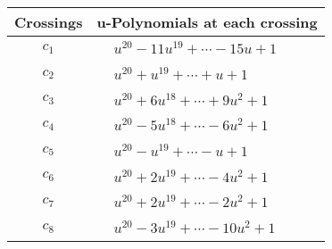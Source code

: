\documentclass[1p]{elsarticle_modified}
\theoremstyle{definition}
\begin{document}
\begin{tabular}{m{50pt}|m{274pt}}
Crossings & \hspace{64pt}u-Polynomials at each crossing \\
\hline $$\begin{aligned}c_{1}\end{aligned}$$&$\begin{aligned}
&u^{20}-11 u^{19}+\cdots-15 u+1
\end{aligned}$\\
\hline $$\begin{aligned}c_{2}\end{aligned}$$&$\begin{aligned}
&u^{20}+u^{19}+\cdots+u+1
\end{aligned}$\\
\hline $$\begin{aligned}c_{3}\end{aligned}$$&$\begin{aligned}
&u^{20}+6 u^{18}+\cdots+9 u^2+1
\end{aligned}$\\
\hline $$\begin{aligned}c_{4}\end{aligned}$$&$\begin{aligned}
&u^{20}-5 u^{18}+\cdots-6 u^2+1
\end{aligned}$\\
\hline $$\begin{aligned}c_{5}\end{aligned}$$&$\begin{aligned}
&u^{20}- u^{19}+\cdots- u+1
\end{aligned}$\\
\hline $$\begin{aligned}c_{6}\end{aligned}$$&$\begin{aligned}
&u^{20}+2 u^{19}+\cdots-4 u^2+1
\end{aligned}$\\
\hline $$\begin{aligned}c_{7}\end{aligned}$$&$\begin{aligned}
&u^{20}+2 u^{19}+\cdots-2 u^2+1
\end{aligned}$\\
\hline $$\begin{aligned}c_{8}\end{aligned}$$&$\begin{aligned}
&u^{20}-3 u^{19}+\cdots-10 u^2+1
\end{aligned}$\\

\end{tabular}
\end{document}
